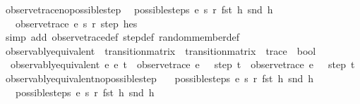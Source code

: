 \begin{isabellebody}
\endisatagproof
{\isafoldproof}%
%
\isadelimproof
\isanewline
%
\endisadelimproof
\isanewline
{}\isamarkupfalse%
\ observe{\isacharunderscore}trace{\isacharunderscore}no{\isacharunderscore}possible{\isacharunderscore}step{\isacharcolon}\isanewline
\ \ {\isachardoublequoteopen}possible{\isacharunderscore}steps\ e\ s\ r\ {\isacharparenleft}fst\ h{\isacharparenright}\ {\isacharparenleft}snd\ h{\isacharparenright}\ {\isacharequal}\ {\isacharbraceleft}{\isacharbar}{\isacharbar}{\isacharbraceright}\ {\isasymLongrightarrow}\isanewline
\ \ \ observe{\isacharunderscore}trace\ e\ s\ r\ step\ {\isacharparenleft}h{\isacharhash}es{\isacharparenright}\ {\isacharequal}\ {\isacharbrackleft}{\isacharbrackright}{\isachardoublequoteclose}\isanewline
%
\isadelimproof
\ \ %
\endisadelimproof
%
\isatagproof
{}\isamarkupfalse%
\ {\isacharparenleft}simp\ add{\isacharcolon}\ observe{\isacharunderscore}trace{\isacharunderscore}def\ step{\isacharunderscore}def\ random{\isacharunderscore}member{\isacharunderscore}def{\isacharparenright}%
\endisatagproof
{\isafoldproof}%
%
\isadelimproof
\isanewline
%
\endisadelimproof
\isanewline
{}\isamarkupfalse%
\ observably{\isacharunderscore}equivalent\ {\isacharcolon}{\isacharcolon}\ {\isachardoublequoteopen}transition{\isacharunderscore}matrix\ {\isasymRightarrow}\ transition{\isacharunderscore}matrix\ {\isasymRightarrow}\ trace\ {\isasymRightarrow}\ bool{\isachardoublequoteclose}\ \isanewline
\ \ {\isachardoublequoteopen}observably{\isacharunderscore}equivalent\ e{}\ e{}\ t\ {\isasymequiv}\ {\isacharparenleft}{\isacharparenleft}observe{\isacharunderscore}trace\ e{}\ {}\ {\isacharless}{\isachargreater}\ step\ t{\isacharparenright}\ {\isacharequal}\ {\isacharparenleft}observe{\isacharunderscore}trace\ e{}\ {}\ {\isacharless}{\isachargreater}\ step\ t{\isacharparenright}{\isacharparenright}{\isachardoublequoteclose}\isanewline
\isanewline
{}\isamarkupfalse%
\ observably{\isacharunderscore}equivalent{\isacharunderscore}no{\isacharunderscore}possible{\isacharunderscore}step{\isacharcolon}\ \isanewline
\ \ {\isachardoublequoteopen}possible{\isacharunderscore}steps\ e{}\ s{}\ r{}\ {\isacharparenleft}fst\ h{\isacharparenright}\ {\isacharparenleft}snd\ h{\isacharparenright}\ {\isacharequal}\ {\isacharbraceleft}{\isacharbar}{\isacharbar}{\isacharbraceright}\ {\isasymLongrightarrow}\isanewline
\ \ \ possible{\isacharunderscore}steps\ e{}\ s{}\ r{}\ {\isacharparenleft}fst\ h{\isacharparenright}\ {\isacharparenleft}snd\ h{\isacharparenright}\ {\isacharequal}\ {\isacharbraceleft}{\isacharbar}{\isacharbar}{\isacharbraceright}\ {\isasymLongrightarrow}\isanewline

\end{isabellebody}
